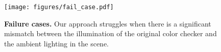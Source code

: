 \begin{figure}[t]
    \centering
    \texttt{[image: figures/fail\_case.pdf]}
    \vspace{-7mm}
    \caption{\textbf{Failure cases.} Our approach struggles when there is a significant mismatch between the illumination of the original color checker and the ambient lighting in the scene.}
    \label{fig:failure}
\end{figure}